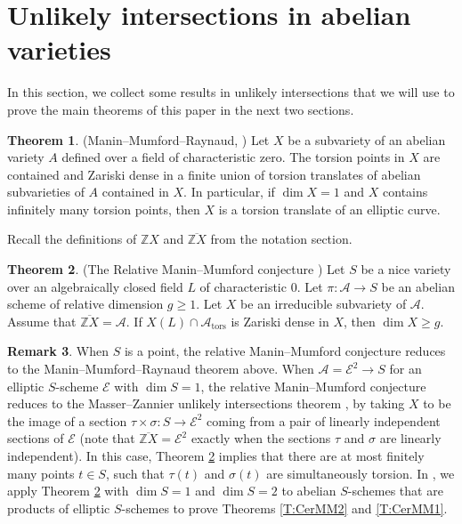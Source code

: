\documentclass[reqno,10pt]{amsart}
\theoremstyle{definition}
\newtheorem{thm}{Theorem}[section]
\theoremstyle{definition}
\newtheorem{rem}[thm]{Remark}
\def\Z{{\mathbb Z}}
\DeclareMathOperator{\tors}{tors}
\begin{document}
\section{Unlikely intersections in abelian varieties}
In this section, we collect some results in unlikely intersections that we will use to prove the main theorems of this paper in the next two sections.
 
\begin{thm}\label{thm:manin-mumford}(Manin--Mumford--Raynaud, \cite[Theorem~3.1]{MasserZannier})
Let $X$ be a subvariety of an abelian variety $A$ defined over a field of characteristic zero. The torsion points in $X$ are contained and Zariski dense in a finite union of torsion translates of abelian subvarieties of $A$ contained in $X$. In particular,  if $\dim X = 1$ and $X$ contains infinitely many torsion points, then $X$ is a torsion translate of an elliptic curve.
\end{thm}

Recall the definitions of $\Z X$ and $\overline{\Z X}$ from the notation section. 

\begin{thm}\label{thm:RelManMum}(The Relative Manin--Mumford conjecture \cite[Theorem~1.1]{RelManMum})
Let $S$ be a nice variety over an algebraically closed field $L$ of characteristic $0$. Let $\pi \colon \mathcal{A} \rightarrow S$ be an abelian scheme of relative dimension $g \geq 1$. Let $X$ be an irreducible subvariety of $\mathcal{A}$. Assume that $\overline{\Z X} = \mathcal{A}$. If $X(L) \cap \mathcal{A}_{\tors}$ is Zariski dense in $X$, then $\dim X \geq g$.
\end{thm}


\begin{rem}\label{rem:MasserZannier} When $S$ is a point, the relative Manin--Mumford conjecture reduces to the Manin--Mumford--Raynaud theorem above. When $\mathcal{A} = \mathcal{E}^2 \rightarrow S$  for an elliptic $S$-scheme $\mathcal{E}$ with $\dim S=1$, the relative Manin--Mumford conjecture reduces to the Masser--Zannier unlikely intersections theorem \cite{MasserZanniertorsion},
by taking $X$ to be the image of a section $\tau\times\sigma \colon S\rightarrow \mathcal{E}^2$ coming from a pair of linearly independent sections of $\mathcal{E}$ (note that $\overline{\Z X} = \mathcal{E}^2$ exactly when the sections $\tau$ and $\sigma$ are linearly independent).
In this case, Theorem \ref{thm:RelManMum} implies that there are at most finitely many points $t\in S$, such that $\tau(t)$ and $\sigma(t)$ are simultaneously torsion. In , we apply Theorem \ref{thm:RelManMum} with $\dim S = 1$ and $\dim S = 2$ to abelian $S$-schemes that are products of elliptic $S$-schemes to prove Theorems \ref{T:CerMM2} and  \ref{T:CerMM1}. 
\end{rem}
\end{document}

